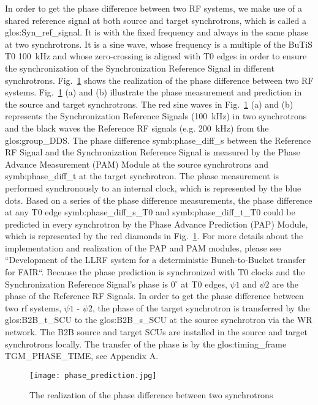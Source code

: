 In order to get the phase difference between two RF systems, we make use of a shared reference signal at both source and target synchrotrons, which is called a \gls{glos:Syn_ref_signal}. It is with the fixed frequency and always in the same phase at two synchrotrons. It is a sine wave, whose frequency is a multiple of the BuTiS T0 \SI{100}{kHz} and whose zero-crossing is aligned with T0 edges in order to ensure the synchronization of the Synchronization Reference Signal in different synchrotrons. Fig.~\ref{phase_prediction} shows the realization of the phase difference between two RF systems. Fig.~\ref{phase_prediction} (a) and (b) illustrate the phase measurement and prediction in the source and target synchrotrons. The red sine waves in Fig.~\ref{phase_prediction} (a) and (b) represents the Synchronization Reference Signals (\SI{100}{kHz}) in two synchrotrons and the black waves the Reference RF signals (e.g. \SI{200}{kHz}) from the \gls{glos:group_DDS}. The phase difference \gls{symb:phase_diff_s} between the Reference RF Signal and the Synchronization Reference Signal is measured by the Phase Advance Measurement (\gls{PAM}) Module at the source synchrotrons and \gls{symb:phase_diff_t} at the target synchrotron. The phase measurement is performed synchronously to an internal clock, which is represented by the blue dots. Based on a series of the phase difference measurements, the phase difference at any T0 edge \gls{symb:phase_diff_s_T0} and \gls{symb:phase_diff_t_T0} could be predicted in every synchrotron by the Phase Advance Prediction (\gls{PAP}) Module, which is represented by the red diamonds in Fig.~\ref{phase_prediction}. For more details about the implementation and realization of the PAP and PAM modules, please see ``Development of the LLRF system for a deterministic Bunch-to-Bucket transfer for FAIR``. Because the phase prediction is synchronized with T0 clocks and the Synchronization Reference Signal's phase is $0^\circ$ at T0 edges, $\psi1$ and $\psi2$ are the phase of the Reference RF Signals. In order to get the phase difference between two rf systems, $\psi1$ - $\psi2$, the phase of the target synchrotron is transferred by the \gls{glos:B2B_t_SCU} to the \gls{glos:B2B_s_SCU} at the source synchrotron via the WR network. The B2B source and target SCUs are installed in the source and target synchrotrons locally. The transfer of the phase is by the \gls{glos:timing_frame} TGM\_PHASE\_TIME, see Appendix A.

\begin{figure}[!htb]
   \centering   
   \texttt{[image: phase\_prediction.jpg]}
   \caption{The realization of the phase difference between two synchrotrons}
   \label{phase_prediction}
\end{figure}

